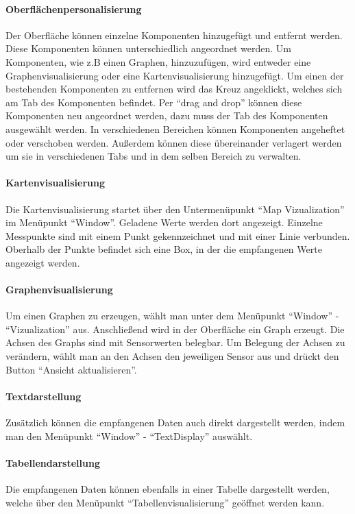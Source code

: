 \paragraph{Oberflächenpersonalisierung}
Der Oberfläche können einzelne Komponenten hinzugefügt und entfernt werden. Diese Komponenten können unterschiedlich angeordnet werden. Um Komponenten, wie z.B einen Graphen, hinzuzufügen, wird entweder eine Graphenvisualisierung oder eine Kartenvisualisierung hinzugefügt. Um einen der bestehenden Komponenten zu entfernen wird das Kreuz angeklickt, welches sich am Tab des Komponenten befindet. Per ``drag and drop''  können diese Komponenten neu angeordnet werden, dazu muss der Tab des Komponenten ausgewählt werden. In verschiedenen Bereichen können Komponenten angeheftet oder verschoben werden. Außerdem können diese übereinander verlagert werden um sie in verschiedenen Tabs und in dem selben Bereich zu verwalten.
\paragraph{Kartenvisualisierung}
Die Kartenvisualisierung startet über den Untermenüpunkt ``Map Vizualization'' im Menüpunkt ``Window''. Geladene Werte werden dort angezeigt. Einzelne Messpunkte sind mit einem Punkt gekennzeichnet und mit einer Linie verbunden. Oberhalb der Punkte befindet sich eine Box, in der die empfangenen Werte angezeigt werden.
\paragraph{Graphenvisualisierung}
Um einen Graphen zu erzeugen, wählt man unter dem Menüpunkt ``Window'' - ``Vizualization'' aus. Anschließend wird in der Oberfläche ein Graph erzeugt. Die Achsen des Graphs sind mit Sensorwerten belegbar. Um Belegung der Achsen zu verändern, wählt man an den Achsen den jeweiligen Sensor aus und drückt den Button ``Ansicht aktualisieren''.

\paragraph{Textdarstellung}
Zusätzlich können die empfangenen Daten auch direkt dargestellt werden, indem man den Menüpunkt ``Window'' - ``TextDisplay'' auswählt.

\paragraph {Tabellendarstellung}
Die empfangenen Daten können ebenfalls in einer Tabelle dargestellt werden, welche über den Menüpunkt ``Tabellenvisualisierung'' geöffnet werden kann.

